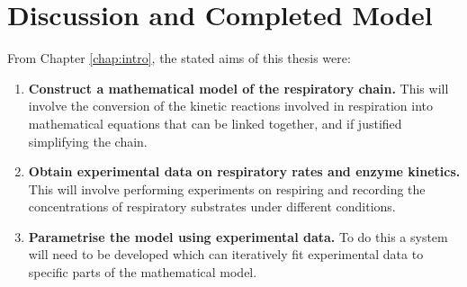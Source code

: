 \chapter{Discussion and Completed Model}
\label{chap:completedmodel}
From Chapter \ref{chap:intro}, the stated aims of this thesis were:
\begin{enumerate}
\item {\bf Construct a mathematical model of the \Nm{} respiratory chain.} This will involve the conversion of the kinetic reactions involved in respiration into mathematical equations that can be linked together, and if justified simplifying the chain.
\item {\bf Obtain experimental data on respiratory rates and enzyme kinetics.} This will involve performing experiments on respiring \Nm{} and recording the concentrations of respiratory substrates under different conditions.
\item {\bf Parametrise the model using experimental data.} To do this a system will need to be developed which can iteratively fit experimental data to specific parts of the mathematical model.
\end{enumerate}

